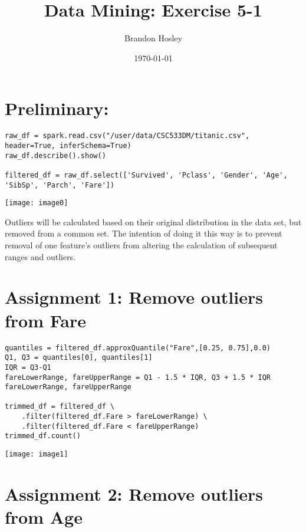 \documentclass[]{article}
\title{Data Mining: Exercise 5-1}
\author{Brandon Hosley}
\date{\today}
\begin{document}
\maketitle

\section*{Preliminary: }

\begin{verbatim}
raw_df = spark.read.csv("/user/data/CSC533DM/titanic.csv", header=True, inferSchema=True)
raw_df.describe().show()

filtered_df = raw_df.select(['Survived', 'Pclass', 'Gender', 'Age', 'SibSp', 'Parch', 'Fare'])
\end{verbatim}
\texttt{[image: image0]}

Outliers will be calculated based on their original distribution in the data set, but removed from a common set. 
The intention of doing it this way is to prevent removal of one feature's outliers from altering the calculation of subsequent ranges and outliers.

\clearpage

\section*{Assignment 1: Remove outliers from Fare}

\begin{verbatim}
quantiles = filtered_df.approxQuantile("Fare",[0.25, 0.75],0.0)
Q1, Q3 = quantiles[0], quantiles[1]
IQR = Q3-Q1
fareLowerRange, fareUpperRange = Q1 - 1.5 * IQR, Q3 + 1.5 * IQR
fareLowerRange, fareUpperRange

trimmed_df = filtered_df \
	.filter(filtered_df.Fare > fareLowerRange) \
	.filter(filtered_df.Fare < fareUpperRange)
trimmed_df.count()
\end{verbatim}
\texttt{[image: image1]}


\section*{Assignment 2: Remove outliers from Age}
\end{document}
